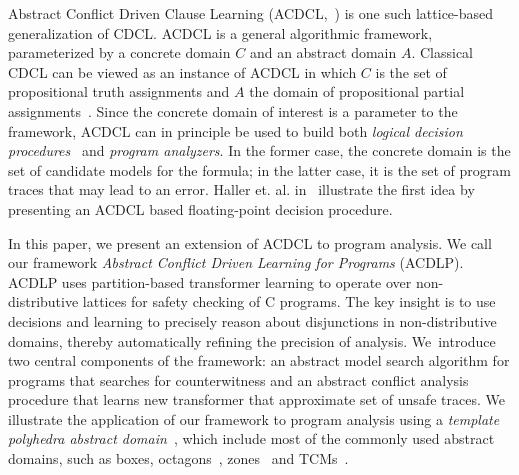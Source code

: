 Abstract Conflict Driven Clause Learning (ACDCL,~\cite{dhk2013-popl}) is one 
such lattice-based generalization of CDCL.  ACDCL is a general algorithmic 
framework, parameterized by a concrete domain $C$  and an abstract domain
$A$. Classical CDCL can be viewed as an instance of ACDCL 
in which $C$ is the set of propositional truth assignments and $A$ the 
domain of propositional partial assignments~\cite{leo-thesis}.  Since 
the concrete domain of interest is a parameter to the framework, 
ACDCL can in principle be used to build both 
\emph{logical decision procedures}~\cite{DBLP:journals/fmsd/BrainDGHK14} 
and \emph{program analyzers}.  In the former case, the concrete domain is the 
set of candidate models for the formula; in the latter case, it is the 
set of program traces that may lead to an error.  Haller et. al. 
in~\cite{DBLP:journals/fmsd/BrainDGHK14,sas13,fmcad12} illustrate the 
first idea by presenting an ACDCL based floating-point decision procedure.  
%


In this paper, we present an extension of ACDCL to program analysis.
We call our framework \emph{Abstract Conflict Driven Learning for Programs}
(ACDLP).   ACDLP uses partition-based transformer learning to operate over
non-distributive lattices for safety checking of C programs.  The key insight
is to use decisions and learning to precisely reason about disjunctions in
non-distributive domains, thereby automatically refining the precision of
analysis.  We~introduce two central components of the framework: an abstract
model search algorithm for programs that searches for counterwitness and an 
abstract conflict analysis procedure that learns new transformer that
approximate set of unsafe traces.  
We illustrate the application of our framework to program analysis 
using a \textit{template polyhedra abstract domain}~\cite{tacas08}, which 
include most of the commonly used abstract domains, such as boxes, 
octagons~\cite{octagon}, zones~\cite{minethesis} and TCMs~\cite{vmcai05}.  

